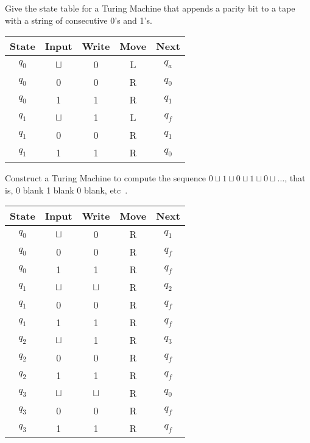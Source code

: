\documentclass[a4paper, 12pt]{exam}
\begin{document}
\begin{questions}
\question
  Give the state table for a Turing Machine that appends a parity bit to a tape with a string of consecutive 0's and 1's.
  \begin{solution}
    \begin{table}[H]
      \centering
      \begin{tabular}{ccccc}
        \toprule
            State & Input & Write & Move & Next \\
        \midrule
            \( q_0 \) & \( \sqcup \) & 0 & L & \( q_a \) \\
            \( q_0 \) & 0 & 0 & R & \( q_0 \) \\
            \( q_0 \) & 1 & 1 & R & \( q_1 \) \\
        \midrule
            \( q_1 \) & \( \sqcup \) & 1 & L & \( q_f \) \\
            \( q_1 \) & 0 & 0 & R & \( q_1 \) \\
            \( q_1 \) & 1 & 1 & R & \( q_0 \) \\
        \bottomrule
        \hline
      \end{tabular}
    \end{table}
  \end{solution}


\question
  Construct a Turing Machine to compute the sequence \( 0 \sqcup 1 \sqcup 0 \sqcup 1 \sqcup 0 \sqcup \ldots \), that is, 0 blank 1 blank 0 blank, etc~\cite{turing37}.
  \begin{solution}
    \begin{table}[H]
      \centering
      \begin{tabular}{ccccc}
        \toprule
            State & Input & Write & Move & Next \\ 
        \midrule
            \( q_0 \) & \( \sqcup \) & 0 & R & \( q_1 \) \\
            \( q_0 \) & 0 & 0 & R & \( q_f \) \\
            \( q_0 \) & 1 & 1 & R & \( q_f \) \\
        \midrule
            \( q_1 \) & \( \sqcup \) & \( \sqcup \) & R & \( q_2 \) \\
            \( q_1 \) & 0 & 0 & R & \( q_f \) \\
            \( q_1 \) & 1 & 1 & R & \( q_f \) \\
        \midrule
            \( q_2 \) & \( \sqcup \) & 1 & R & \( q_3 \) \\
            \( q_2 \) & 0 & 0 & R & \( q_f \) \\
            \( q_2 \) & 1 & 1 & R & \( q_f \) \\
        \midrule
            \( q_3 \) & \( \sqcup \) & \( \sqcup \) & R & \( q_0 \) \\
            \( q_3 \) & 0 & 0 & R & \( q_f \) \\
            \( q_3 \) & 1 & 1 & R & \( q_f \) \\
        \bottomrule
        \hline
      \end{tabular}
    \end{table}
  \end{solution}
 


\end{questions}
\end{document}
